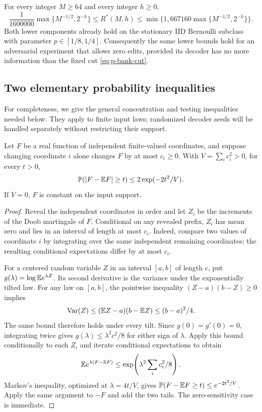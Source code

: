\begin{theorem}
\label{thm:bank-precision}
For every integer $M\ge64$ and every integer $h\ge0$,
\begin{equation}\label{eq:p-bank-rate}
 \frac1{1600000}\max\{M^{-1/2},2^{-h}\}
 \le R^*(M,h)
 \le\min\bigl\{1,667160\max\{M^{-1/2},2^{-h}\}\bigr\}.
\end{equation}
Both lower components already hold on the stationary IID Bernoulli
subclass with parameter $p\in[1/8,1/4]$.  Consequently the same lower
bounds hold for an adversarial experiment that allows zero edits,
provided its decoder has no more information than the fixed cut
\eqref{eq:p-bank-cut}.
\end{theorem}

\subsection{Two elementary probability inequalities}

For completeness, we give the general concentration and testing
inequalities needed below.  They apply to finite input laws; randomized
decoder seeds will be handled separately without restricting their
support.

\begin{lemma}
\label{lem:p-bounded-differences}
Let $F$ be a real function of independent finite-valued coordinates,
and suppose changing coordinate $i$ alone changes $F$ by at most
$c_i\ge0$.  With $V=\sum_i c_i^2>0$, for every $t>0$,
\[
 \mathbb P(|F-\mathbb E F|\ge t)\le2\exp(-2t^2/V).
\]
If $V=0$, $F$ is constant on the input support.
\end{lemma}
\begin{proof}
Reveal the independent coordinates in order and let $Z_i$ be the
increments of the Doob martingale of $F$.  Conditional on any revealed
prefix, $Z_i$ has mean zero and lies in an interval of length at most
$c_i$.  Indeed, compare two values of coordinate $i$ by integrating
over the same independent remaining coordinates; the resulting
conditional expectations differ by at most $c_i$.

For a centered random variable $Z$ in an interval $[a,b]$ of length
$c$, put $g(\lambda)=\log\mathbb E e^{\lambda Z}$.  Its second derivative
is the variance under the exponentially tilted law.  For any law on
$[a,b]$, the pointwise inequality $(Z-a)(b-Z)\ge0$ implies
\[
 \operatorname{Var}(Z)\le(\mathbb E Z-a)(b-\mathbb E Z)\le(b-a)^2/4.
\]
The same bound therefore holds under every tilt.  Since
$g(0)=g'(0)=0$, integrating twice gives
$g(\lambda)\le\lambda^2c^2/8$ for either sign of $\lambda$.
Apply this bound conditionally to each $Z_i$ and iterate conditional
expectations to obtain
\[
 \mathbb E e^{\lambda(F-\mathbb E F)}\le
 \exp\!\left(\lambda^2\sum_i c_i^2/8\right).
\]
Markov's inequality, optimized at $\lambda=4t/V$, gives
$\mathbb P(F-\mathbb E F\ge t)\le e^{-2t^2/V}$.
Apply the same argument to $-F$ and add the two tails.
The zero-sensitivity case is immediate.
\end{proof}


